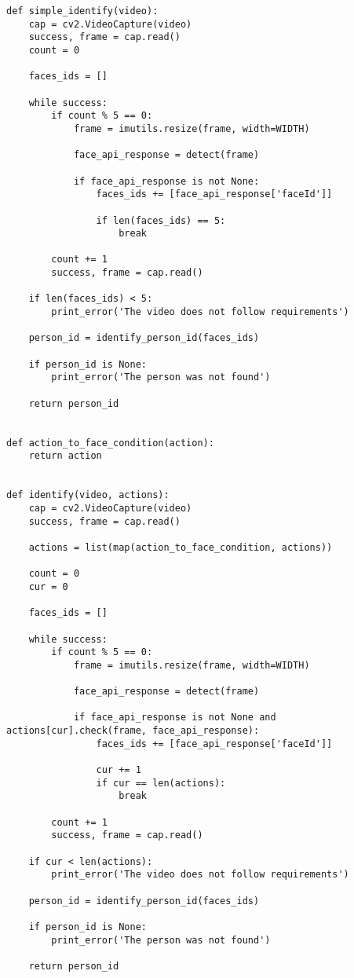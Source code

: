 \begin{verbatim}
def simple_identify(video):
    cap = cv2.VideoCapture(video)
    success, frame = cap.read()
    count = 0

    faces_ids = []

    while success:
        if count % 5 == 0:
            frame = imutils.resize(frame, width=WIDTH)

            face_api_response = detect(frame)

            if face_api_response is not None:
                faces_ids += [face_api_response['faceId']]

                if len(faces_ids) == 5:
                    break

        count += 1
        success, frame = cap.read()

    if len(faces_ids) < 5:
        print_error('The video does not follow requirements')

    person_id = identify_person_id(faces_ids)

    if person_id is None:
        print_error('The person was not found')

    return person_id


def action_to_face_condition(action):
    return action


def identify(video, actions):
    cap = cv2.VideoCapture(video)
    success, frame = cap.read()

    actions = list(map(action_to_face_condition, actions))

    count = 0
    cur = 0

    faces_ids = []

    while success:
        if count % 5 == 0:
            frame = imutils.resize(frame, width=WIDTH)

            face_api_response = detect(frame)

            if face_api_response is not None and actions[cur].check(frame, face_api_response):
                faces_ids += [face_api_response['faceId']]

                cur += 1
                if cur == len(actions):
                    break

        count += 1
        success, frame = cap.read()

    if cur < len(actions):
        print_error('The video does not follow requirements')

    person_id = identify_person_id(faces_ids)

    if person_id is None:
        print_error('The person was not found')

    return person_id
\end{verbatim}

